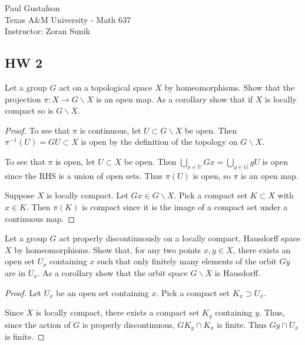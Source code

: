 \documentclass{article}
\begin{document}
\noindent Paul Gustafson\\
\noindent Texas A\&M University - Math 637\\ 
\noindent Instructor: Zoran Sunik

\subsection*{HW 2}
 Let a group $G$ act on a topological space $X$ by homeomorphisms.  Show that the projection $\pi: X \to G \backslash X$ is an open map.
 As a corollary show that  if $X$ is locally compact so is $G \backslash X$.
\begin{proof}
To see that $\pi$ is continuous, let $U \subset G \backslash X$ be open.  Then $\pi^{-1}(U) = GU \subset X$ is open by the definition of the topology on $G \backslash X$.

To see that $\pi$ is open, let $U \subset X$ be open.  Then $\bigcup_{x \in U} Gx = \bigcup_{g \in G} gU$ is open since the RHS is a union of open sets.  Thus $\pi(U)$ is open, so $\pi$ is an open map.

Suppose $X$ is locally compact.  Let $Gx \in G \backslash X$.  Pick a compact set $K \subset X$ with $x \in K$.  Then $\pi(K)$ is compact since it is the image of a compact set under a continuous map. 
\end{proof}

 Let a group $G$ act properly discontinuously on a locally compact, Hausdorff space $X$ by homeomorphisms.  Show that, for any two points $x, y \in X$, there exists an open set $U_x$ containing $x$ such that only finitely many elements of the orbit $Gy$ are in $U_x$.
As a corollary show that the orbit space $G \backslash X$ is Hausdorff.
\begin{proof}
Let $U_x$ be an open set containing $x$.  Pick a compact set $K_x \supset U_x$. %

  Since $X$ is locally compact, there exists a compact set $K_y$ containing $y$.  Thus, since the action of $G$ is properly discontinuous, $G K_y \cap K_x$ is finite.  Thus $Gy \cap U_x$ is finite.
\end{proof}
\end{document}
